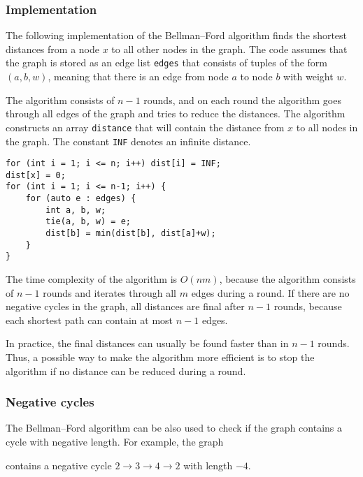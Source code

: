 \subsubsection{Implementation}

The following implementation of the
Bellman–Ford algorithm finds the shortest distances
from a node $x$ to all other nodes in the graph.
The code assumes that the graph is stored
as an edge list \texttt{edges}
that consists of tuples of the form $(a,b,w)$,
meaning that there is an edge from node $a$ to node $b$
with weight $w$.

The algorithm consists of $n-1$ rounds,
and on each round the algorithm goes through
all edges of the graph and tries to
reduce the distances.
The algorithm constructs an array \texttt{distance}
that will contain the distance from $x$
to all nodes in the graph.
The constant \texttt{INF} denotes an infinite distance.

\begin{lstlisting}
for (int i = 1; i <= n; i++) dist[i] = INF;
dist[x] = 0;
for (int i = 1; i <= n-1; i++) {
    for (auto e : edges) {
        int a, b, w;
        tie(a, b, w) = e;
        dist[b] = min(dist[b], dist[a]+w);
    }
}
\end{lstlisting}

The time complexity of the algorithm is $O(nm)$,
because the algorithm consists of $n-1$ rounds and
iterates through all $m$ edges during a round.
If there are no negative cycles in the graph,
all distances are final after $n-1$ rounds,
because each shortest path can contain at most $n-1$ edges.

In practice, the final distances can usually
be found faster than in $n-1$ rounds.
Thus, a possible way to make the algorithm more efficient
is to stop the algorithm if no distance
can be reduced during a round.

\subsubsection{Negative cycles}


The Bellman–Ford algorithm can be also used to
check if the graph contains a cycle with negative length.
For example, the graph

\begin{center}
\end{center}
\noindent
contains a negative cycle
$2 \rightarrow 3 \rightarrow 4 \rightarrow 2$
with length $-4$.

